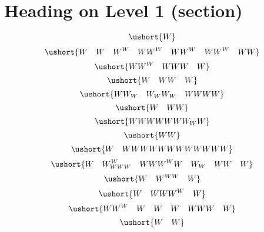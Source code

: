 \documentclass[12pt]{article}
\begin{document}
\section{Heading on Level 1 (section)}
\color{red}\[\ushort{W}\]
\color{orange}\[\ushort{W \quad W \quad W^{W} \quad WW^{W} \quad WW^{W} \quad WW^{W} \quad WW}\]
\color{lime}\[\ushort{WW^{W} \quad WWW \quad W}\]
\color{blue}\[\ushort{W \quad WW \quad W}\]
\color{red}\[\ushort{WW_{W} \quad W_{W}W_{W} \quad WWWW}\]
\color{orange}\[\ushort{W \quad WW}\]
\color{lime}\[\ushort{WWWWWWW_{W}W}\]
\color{cyan}\[\ushort{WW}\]
\color{blue}\[\ushort{W \quad WWWWWWWWWWWW}\]
\color{red}\[\ushort{W \quad W^{W}_{WWW} \quad WWW^{W}W \quad W_{W} \quad WW \quad W}\]
\color{orange}\[\ushort{W \quad W^{WW} \quad W}\]
\color{lime}\[\ushort{W \quad WWW^{W} \quad W}\]
\color{cyan}\[\ushort{WW^{W} \quad W \quad W \quad W \quad WWW \quad W}\]
\color{red}\[\ushort{W \quad W}\]
\end{document}
